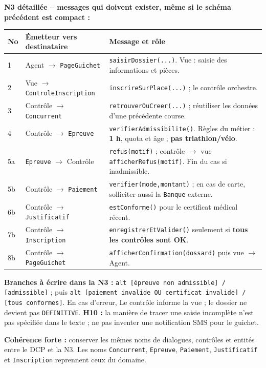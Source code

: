 \textbf{N3 détaillée -- messages qui doivent exister, même si le schéma précédent est compact :}
\begin{longtable}{@{}p{13mm}p{52mm}p{80mm}@{}}
\toprule
No & Émetteur vers destinataire & Message et rôle \\
\midrule\endhead
1 & Agent \(\to\) \texttt{PageGuichet} & \texttt{saisirDossier(...)}. Vue : saisie des informations et pièces.\\
2 & Vue \(\to\) \texttt{ControleInscription} & \texttt{inscrireSurPlace(...)} ; le contrôle orchestre.\\
3 & Contrôle \(\to\) \texttt{Concurrent} & \texttt{retrouverOuCreer(...)} ; réutiliser les données d'une précédente course.\\
4 & Contrôle \(\to\) \texttt{Epreuve} & \texttt{verifierAdmissibilite()}. Règles du métier : \textbf{1 h}, quota et âge ; \textbf{pas triathlon/vélo}.\\
5a & \texttt{Epreuve} \(\to\) Contrôle & \texttt{refus(motif)} ; contrôle \(\to\) vue \texttt{afficherRefus(motif)}. Fin du cas si inadmissible.\\
5b & Contrôle \(\to\) \texttt{Paiement} & \texttt{verifier(mode,montant)} ; en cas de carte, solliciter aussi la \texttt{Banque} externe.\\
6b & Contrôle \(\to\) \texttt{Justificatif} & \texttt{estConforme()} pour le certificat médical récent.\\
7b & Contrôle \(\to\) \texttt{Inscription} & \texttt{enregistrerEtValider()} seulement si \textbf{tous les contrôles sont OK}.\\
8b & Contrôle \(\to\) \texttt{PageGuichet} & \texttt{afficherConfirmation(dossard)} puis vue \(\to\) Agent.\\
\bottomrule
\end{longtable}
\textbf{Branches à écrire dans la N3 :} \texttt{alt [épreuve non admissible] / [admissible]} ; puis \texttt{alt [paiement invalide OU certificat invalide] / [tous conformes]}. En cas d'erreur, Le contrôle informe la vue ; le dossier ne devient pas \texttt{DEFINITIVE}. \textbf{H10 :} la manière de tracer une saisie incomplète n'est pas spécifiée dans le texte ; ne pas inventer une notification SMS pour le guichet.\par
\textbf{Cohérence forte :} conserver les mêmes noms de dialogues, contrôles et entités entre le DCP et la N3. Les noms \texttt{Concurrent}, \texttt{Epreuve}, \texttt{Paiement}, \texttt{Justificatif} et \texttt{Inscription} reprennent ceux du domaine.

